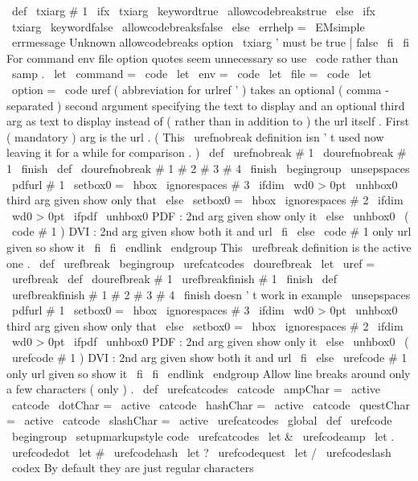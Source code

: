 {{{
%
\
def
\
txiarg
{
#
1
}
%
\
ifx
\
txiarg
\
keywordtrue
\
allowcodebreakstrue
\
else
\
ifx
\
txiarg
\
keywordfalse
\
allowcodebreaksfalse
\
else
\
errhelp
=
\
EMsimple
\
errmessage
{
Unknown
allowcodebreaks
option
\
txiarg
'
must
be
true
|
false
}
%
\
fi
\
fi
}
%
For
command
env
file
option
quotes
seem
unnecessary
%
so
use
\
code
rather
than
\
samp
.
\
let
\
command
=
\
code
\
let
\
env
=
\
code
\
let
\
file
=
\
code
\
let
\
option
=
\
code
%
uref
(
abbreviation
for
urlref
'
)
takes
an
optional
(
comma
-
separated
)
%
second
argument
specifying
the
text
to
display
and
an
optional
third
%
arg
as
text
to
display
instead
of
(
rather
than
in
addition
to
)
the
url
%
itself
.
First
(
mandatory
)
arg
is
the
url
.
%
(
This
\
urefnobreak
definition
isn
'
t
used
now
leaving
it
for
a
while
%
for
comparison
.
)
\
def
\
urefnobreak
#
1
{
\
dourefnobreak
#
1
\
finish
}
\
def
\
dourefnobreak
#
1
#
2
#
3
#
4
\
finish
{
\
begingroup
\
unsepspaces
\
pdfurl
{
#
1
}
%
\
setbox0
=
\
hbox
{
\
ignorespaces
#
3
}
%
\
ifdim
\
wd0
>
0pt
\
unhbox0
%
third
arg
given
show
only
that
\
else
\
setbox0
=
\
hbox
{
\
ignorespaces
#
2
}
%
\
ifdim
\
wd0
>
0pt
\
ifpdf
\
unhbox0
%
PDF
:
2nd
arg
given
show
only
it
\
else
\
unhbox0
\
(
\
code
{
#
1
}
)
%
DVI
:
2nd
arg
given
show
both
it
and
url
\
fi
\
else
\
code
{
#
1
}
%
only
url
given
so
show
it
\
fi
\
fi
\
endlink
\
endgroup
}
%
This
\
urefbreak
definition
is
the
active
one
.
\
def
\
urefbreak
{
\
begingroup
\
urefcatcodes
\
dourefbreak
}
\
let
\
uref
=
\
urefbreak
\
def
\
dourefbreak
#
1
{
\
urefbreakfinish
#
1
\
finish
}
\
def
\
urefbreakfinish
#
1
#
2
#
3
#
4
\
finish
{
%
doesn
'
t
work
in
example
\
unsepspaces
\
pdfurl
{
#
1
}
%
\
setbox0
=
\
hbox
{
\
ignorespaces
#
3
}
%
\
ifdim
\
wd0
>
0pt
\
unhbox0
%
third
arg
given
show
only
that
\
else
\
setbox0
=
\
hbox
{
\
ignorespaces
#
2
}
%
\
ifdim
\
wd0
>
0pt
\
ifpdf
\
unhbox0
%
PDF
:
2nd
arg
given
show
only
it
\
else
\
unhbox0
\
(
\
urefcode
{
#
1
}
)
%
DVI
:
2nd
arg
given
show
both
it
and
url
\
fi
\
else
\
urefcode
{
#
1
}
%
only
url
given
so
show
it
\
fi
\
fi
\
endlink
\
endgroup
}
%
Allow
line
breaks
around
only
a
few
characters
(
only
)
.
\
def
\
urefcatcodes
{
%
\
catcode
\
ampChar
=
\
active
\
catcode
\
dotChar
=
\
active
\
catcode
\
hashChar
=
\
active
\
catcode
\
questChar
=
\
active
\
catcode
\
slashChar
=
\
active
}
{
\
urefcatcodes
%
\
global
\
def
\
urefcode
{
\
begingroup
\
setupmarkupstyle
{
code
}
%
\
urefcatcodes
\
let
&
\
urefcodeamp
\
let
.
\
urefcodedot
\
let
#
\
urefcodehash
\
let
?
\
urefcodequest
\
let
/
\
urefcodeslash
\
codex
}
%
%
By
default
they
are
just
regular
characters
}}}
